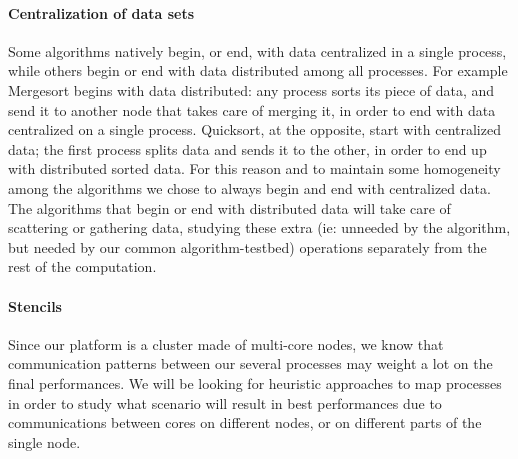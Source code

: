 \paragraph{Centralization of data sets} Some algorithms natively begin, or end, with data centralized in a single process, while others begin or end with data distributed among all processes. For example Mergesort begins with data distributed: any process sorts its piece of data, and send it to another node that takes care of merging it, in order to end with data centralized on a single process. Quicksort, at the opposite, start with centralized data; the first process splits data and sends it to the other, in order to end up with distributed sorted data. For this reason and to maintain some homogeneity among the algorithms we chose to always begin and end with centralized data. The algorithms that begin or end with distributed data will take care of scattering or gathering data, studying these extra (ie: unneeded by the algorithm, but needed by our common algorithm-testbed) operations separately from the rest of the computation.

\paragraph{Stencils} Since our platform is a cluster made of multi-core nodes, we know that communication patterns between our several processes may weight a lot on the final performances. We will be looking for heuristic approaches to map processes in order to study what scenario will result in best performances due to communications between cores on different nodes, or on different parts of the single node.

